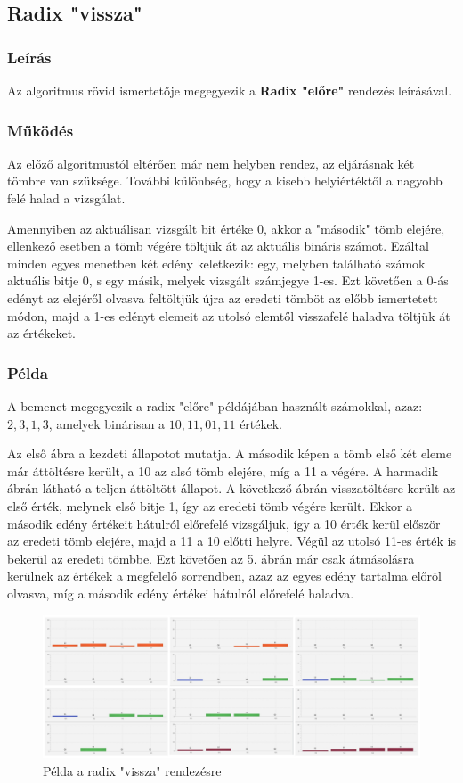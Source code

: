\documentclass{elteikthesis}
\begin{document}
\subsection{Radix "vissza"}
\subsubsection{Leírás}
Az algoritmus rövid ismertetője megegyezik a \textbf{Radix "előre"} rendezés leírásával.
\subsubsection{Működés}
Az előző algoritmustól eltérően már nem helyben rendez, az eljárásnak két tömbre van szüksége. További különbség, hogy a kisebb helyiértéktől a nagyobb felé halad a vizsgálat.\par Amennyiben az aktuálisan vizsgált bit értéke 0, akkor a "második" tömb elejére, ellenkező esetben a tömb végére töltjük át az aktuális bináris számot. Ezáltal minden egyes menetben két edény keletkezik: egy, melyben található számok aktuális bitje 0, s egy másik, melyek vizsgált számjegye 1-es. Ezt követően a 0-ás edényt az elejéről olvasva feltöltjük újra az eredeti tömböt az előbb ismertetett módon, majd a 1-es edényt elemeit az utolsó elemtől visszafelé haladva töltjük át az értékeket.
 \subsubsection{Példa}
 A bemenet megegyezik a radix "előre" példájában használt számokkal, azaz: $2, 3, 1, 3$, amelyek binárisan a $10, 11, 01, 11$ értékek.\par
 Az első ábra a kezdeti állapotot mutatja. A második képen a tömb első két eleme már áttöltésre került, a 10 az alsó tömb elejére, míg a 11 a végére. A harmadik ábrán látható a teljen áttöltött állapot. A következő ábrán visszatöltésre került az első érték, melynek első bitje 1, így az eredeti tömb végére került. Ekkor a második edény értékeit hátulról előrefelé vizsgáljuk, így a 10 érték kerül először az eredeti tömb elejére, majd a 11 a 10 előtti helyre. Végül az utolsó 11-es érték is bekerül az eredeti tömbbe. Ezt követően az 5. ábrán már csak átmásolásra kerülnek az értékek a megfelelő sorrendben, azaz az egyes edény tartalma előröl olvasva, míg a második edény értékei hátulról előrefelé haladva. \par
 \begin{figure}[H]
 	\centering
 	\includegraphics[width=1\textwidth]{pics/radixbackward.jpg}
 	\caption{Példa a radix "vissza" rendezésre}
 \end{figure}\par
\end{document}
